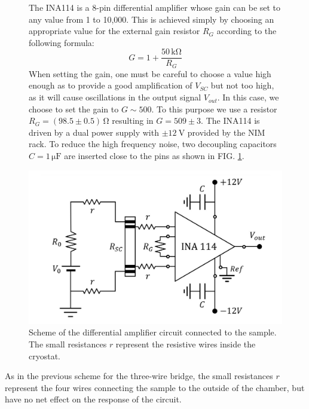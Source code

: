 \documentclass[rmp,10pt,onecolumn,fleqn,notitlepage]{revtex4-1}
\begin{document}
\begin{figure}[H]
      \fontsize{10pt}{12pt}\selectfont
    \begin{minipage}{0.42\linewidth}\setlength{\parindent}{9pt}
    The INA114 is a 8-pin differential amplifier whose gain can be set to any value from 1 to 10,000. This is achieved simply by choosing an appropriate value for the external gain resistor $R_G$ according to the following formula:
    \begin{equation}
        G = 1 + \frac{50\, \si{\kilo \ohm}}{R_G}
    \end{equation}
    When setting the gain, one must be careful to choose a value high enough as to provide a good amplification of $V_{SC}$ but not too high, as it will cause oscillations in the output signal $V_{out}$. In this case, we choose to set the gain to $G \sim 500$. To this purpose we use a resistor $R_G = (98.5 \pm 0.5)\, \si{\ohm}$ resulting in $G = 509 \pm 3$. 
    The INA114 is driven by a dual power supply with $\pm \SI{12}{\volt}$ provided by the NIM rack. 
    To reduce the high frequency noise, two decoupling capacitors $C = 1 \, \si{\micro \farad}$ are inserted close to the pins as shown in FIG. \ref{fig:A_circ}. 
    \end{minipage}
\hfill
    \begin{minipage}{0.5\linewidth}
    \centering
    \includegraphics[width=\textwidth]{image/schemes/Amp_circ_v2.pdf}
    \caption{Scheme of the differential amplifier circuit connected to the sample. The small resistances $r$ represent the resistive wires inside the cryostat.}
    \label{fig:A_circ}
    \end{minipage}
\end{figure}

As in the previous scheme for the three-wire bridge, the small resistances $r$ represent the four wires connecting the sample to the outside of the chamber, but have no net effect on the response of the circuit.
\end{document}
